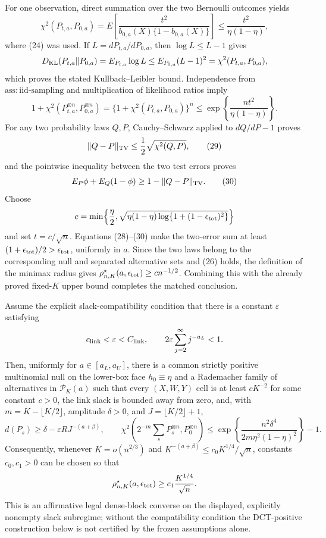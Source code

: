 For one observation, direct summation over the two Bernoulli outcomes yields
\[
 \chi^2(P_{t,a},P_{0,a})
 =E\!\left[\frac{t^2}{b_{0,a}(X)\{1-b_{0,a}(X)\}}\right]
 \le\frac{t^2}{\eta(1-\eta)}, \tag{27}
\]
where (24) was used.  If \(L=dP_{t,a}/dP_{0,a}\), then \(\log L\le L-1\) gives
\[
 D_{\rm KL}(P_{t,a}\|P_{0,a})=E_{P_{t,a}}\log L
 \le E_{P_{0,a}}(L-1)^2=\chi^2(P_{t,a},P_{0,a}),
\]
which proves the stated Kullback--Leibler bound.  Independence from \(\mathrm{ass:iid\mbox{-}sampling}\) and multiplication of likelihood ratios imply
\[
 1+\chi^2(P_{t,a}^{\otimes n},P_{0,a}^{\otimes n})
 =\{1+\chi^2(P_{t,a},P_{0,a})\}^n
 \le\exp\!\left\{\frac{nt^2}{\eta(1-\eta)}\right\}. \tag{28}
\]
For any two probability laws \(Q,P\), Cauchy--Schwarz applied to \(dQ/dP-1\) proves
\[
 \|Q-P\|_{\rm TV}\le\frac12\sqrt{\chi^2(Q,P)}, \tag{29}
\]
and the pointwise inequality between the two test errors proves
\[
 E_P\phi+E_Q(1-\phi)\ge1-\|Q-P\|_{\rm TV}. \tag{30}
\]
Choose
\[
 c=\min\!\left\{\frac\eta2,
 \sqrt{\eta(1-\eta)\log\{1+(1-\epsilon_{\rm tot})^2\}}\right\}
\]
and set \(t=c/\sqrt n\).  Equations (28)--(30) make the two-error sum at least \((1+\epsilon_{\rm tot})/2>\epsilon_{\rm tot}\), uniformly in \(a\).  Since the two laws belong to the corresponding null and separated alternative sets and (26) holds, the definition of the minimax radius gives \(\rho^\star_{n,K}(a,\epsilon_{\rm tot})\ge c n^{-1/2}\).  Combining this with the already proved fixed-\(K\) upper bound completes the matched conclusion.

Assume the explicit slack-compatibility condition that there is a constant \(\varepsilon\) satisfying
\[
 c_{\rm link}<\varepsilon<C_{\rm link},
 \qquad
 2\varepsilon\sum_{j=2}^{\infty}j^{-a_L}<1.
\]
Then, uniformly for \(a\in[a_L,a_U]\), there is a common strictly positive multinomial null on the lower-box face \(h_0\equiv\eta\) and a Rademacher family of alternatives in \(\mathcal P_K(a)\) such that every \((X,W,Y)\) cell is at least \(cK^{-2}\) for some constant \(c>0\), the link slack is bounded away from zero, and, with \(m=K-\lfloor K/2\rfloor\), amplitude \(\delta>0\), and \(J=\lfloor K/2\rfloor+1\),
\[
 d(P_s)\ge \delta-\varepsilon R J^{-(a+\beta)},
 \qquad
 \chi^2\!\left(2^{-m}\sum_sP_s^{\otimes n},P_0^{\otimes n}\right)
 \le \exp\!\left\{\frac{n^2\delta^4}{2m\eta^2(1-\eta)^2}\right\}-1.
\]
Consequently, whenever \(K=o(n^{2/3})\) and \(K^{-(a+\beta)}\le c_0K^{1/4}/\sqrt n\), constants \(c_0,c_1>0\) can be chosen so that
\[
 \rho^\star_{n,K}(a,\epsilon_{\rm tot})\ge c_1\frac{K^{1/4}}{\sqrt n}.
\]
This is an affirmative legal dense-block converse on the displayed, explicitly nonempty slack subregime; without the compatibility condition the DCT-positive construction below is not certified by the frozen assumptions alone.

